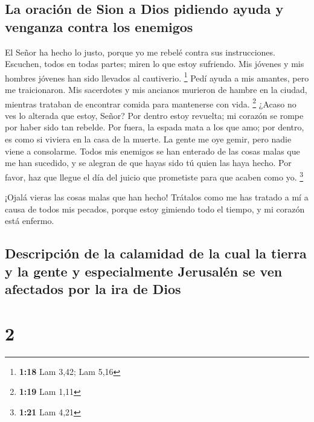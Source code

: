 \hypertarget{la-oraciuxf3n-de-sion-a-dios-pidiendo-ayuda-y-venganza-contra-los-enemigos}{%
\subsection{La oración de Sion a Dios pidiendo ayuda y venganza contra
los
enemigos}\label{la-oraciuxf3n-de-sion-a-dios-pidiendo-ayuda-y-venganza-contra-los-enemigos}}

 El Señor ha hecho lo justo, porque yo me rebelé contra
sus instrucciones. Escuchen, todos en todas partes; miren lo que estoy
sufriendo. Mis jóvenes y mis hombres jóvenes han sido llevados al
cautiverio. \footnote{\textbf{1:18} Lam 3,42; Lam 5,16} 
Pedí ayuda a mis amantes, pero me traicionaron. Mis sacerdotes y mis
ancianos murieron de hambre en la ciudad, mientras trataban de encontrar
comida para mantenerse con vida. \footnote{\textbf{1:19} Lam 1,11}
 ¿Acaso no ves lo alterada que estoy, Señor? Por dentro
estoy revuelta; mi corazón se rompe por haber sido tan rebelde. Por
fuera, la espada mata a los que amo; por dentro, es como si viviera en
la casa de la muerte.  La gente me oye gemir, pero nadie
viene a consolarme. Todos mis enemigos se han enterado de las cosas
malas que me han sucedido, y se alegran de que hayas sido tú quien las
haya hecho. Por favor, haz que llegue el día del juicio que prometiste
para que acaben como yo. \footnote{\textbf{1:21} Lam 4,21}

 ¡Ojalá vieras las cosas malas que han hecho! Trátalos
como me has tratado a mí a causa de todos mis pecados, porque estoy
gimiendo todo el tiempo, y mi corazón está enfermo.

\hypertarget{descripciuxf3n-de-la-calamidad-de-la-cual-la-tierra-y-la-gente-y-especialmente-jerusaluxe9n-se-ven-afectados-por-la-ira-de-dios}{%
\subsection{Descripción de la calamidad de la cual la tierra y la gente
y especialmente Jerusalén se ven afectados por la ira de
Dios}\label{descripciuxf3n-de-la-calamidad-de-la-cual-la-tierra-y-la-gente-y-especialmente-jerusaluxe9n-se-ven-afectados-por-la-ira-de-dios}}

\hypertarget{section-1}{%
\section{2}\label{section-1}}

